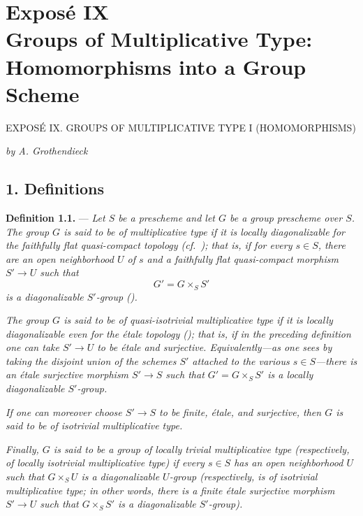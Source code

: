 
\chapter*{Exposé IX\\
Groups of Multiplicative Type:\\
Homomorphisms into a Group Scheme}
  {EXPOSÉ IX. GROUPS OF MULTIPLICATIVE TYPE I (HOMOMORPHISMS)}

\begin{center}
  \textit{by A. Grothendieck}
\end{center}

\section*{1. Definitions}

\medskip
\noindent{}\textbf{Definition 1.1.} ---
\textit{Let \(S\) be a prescheme and let \(G\) be a group prescheme over
\(S\). The group \(G\) is said to be \emph{of multiplicative type} if it
is locally diagonalizable for the faithfully flat quasi-compact topology
(cf.\ ); that is, if for every \(s\in S\), there are an open
neighborhood \(U\) of \(s\) and a faithfully flat quasi-compact morphism
\(S'\to U\) such that
\[
  G'=G\times_S S'
\]
is a diagonalizable \(S'\)-group ().}

\textit{The group \(G\) is said to be \emph{of quasi-isotrivial
multiplicative type} if it is locally diagonalizable even for the étale
topology (); that is, if in the preceding definition one can take
\(S'\to U\) to be étale and surjective. Equivalently---as one sees by
taking the disjoint union of the schemes \(S'\) attached to the various
\(s\in S\)---there is an étale surjective morphism \(S'\to S\) such that
\(G'=G\times_S S'\) is a locally diagonalizable \(S'\)-group.}

\textit{If one can moreover choose \(S'\to S\) to be finite, étale, and
surjective, then \(G\) is said to be \emph{of isotrivial multiplicative
type}.}

\textit{Finally, \(G\) is said to be a group \emph{of locally trivial
multiplicative type} (respectively, \emph{of locally isotrivial
multiplicative type}) if every \(s\in S\) has an open neighborhood \(U\)
such that \(G\times_S U\) is a diagonalizable \(U\)-group (respectively,
is of isotrivial multiplicative type; in other words, there is a finite
étale surjective morphism \(S'\to U\) such that \(G\times_S S'\) is a
diagonalizable \(S'\)-group).}

